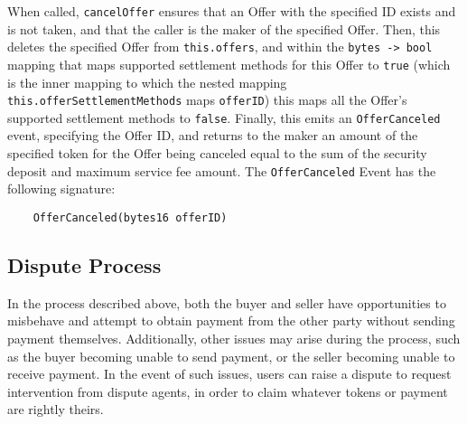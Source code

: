 \documentclass[11pt]{article}
\begin{document}
    When called, \verb|cancelOffer| ensures that an Offer with the specified ID exists and is not
    taken, and that the caller is the maker of the specified Offer.
    Then, this deletes the specified Offer from \verb|this.offers|, and within the
    \verb|bytes -> bool| mapping that maps supported settlement methods for this Offer to
    \verb|true| (which is the inner mapping to which the nested mapping
    \verb|this.offerSettlementMethods| maps \verb|offerID|) this maps all the Offer's supported
    settlement methods to \verb|false|.
    Finally, this emits an \verb|OfferCanceled| event, specifying the Offer ID\@, and returns to the
    maker an amount of the specified token for the Offer being canceled equal to the sum of the
    security deposit and maximum service fee amount.
    The \verb|OfferCanceled| Event has the following signature:
    \begin{verbatim}
    OfferCanceled(bytes16 offerID)
    \end{verbatim}

    \subsection*{Dispute Process}
    In the process described above, both the buyer and seller have opportunities to misbehave and
    attempt to obtain payment from the other party without sending payment themselves.
    Additionally, other issues may arise during the process, such as the buyer becoming unable to
    send payment, or the seller becoming unable to receive payment.
    In the event of such issues, users can raise a dispute to request intervention from dispute
    agents, in order to claim whatever tokens or payment are rightly theirs.
\end{document}
